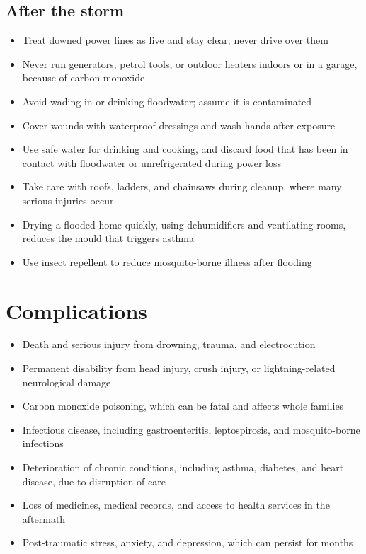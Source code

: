 \subsection*{After the storm}
\begin{itemize}
    \item Treat downed power lines as live and stay clear; never drive over them
    \item Never run generators, petrol tools, or outdoor heaters indoors or in a garage, because of carbon monoxide
    \item Avoid wading in or drinking floodwater; assume it is contaminated
    \item Cover wounds with waterproof dressings and wash hands after exposure
    \item Use safe water for drinking and cooking, and discard food that has been in contact with floodwater or unrefrigerated during power loss
    \item Take care with roofs, ladders, and chainsaws during cleanup, where many serious injuries occur
    \item Drying a flooded home quickly, using dehumidifiers and ventilating rooms, reduces the mould that triggers asthma
    \item Use insect repellent to reduce mosquito-borne illness after flooding
\end{itemize}

\section*{Complications}
\begin{itemize}
    \item Death and serious injury from drowning, trauma, and electrocution
    \item Permanent disability from head injury, crush injury, or lightning-related neurological damage
    \item Carbon monoxide poisoning, which can be fatal and affects whole families
    \item Infectious disease, including gastroenteritis, leptospirosis, and mosquito-borne infections
    \item Deterioration of chronic conditions, including asthma, diabetes, and heart disease, due to disruption of care
    \item Loss of medicines, medical records, and access to health services in the aftermath
    \item Post-traumatic stress, anxiety, and depression, which can persist for months
\end{itemize}

